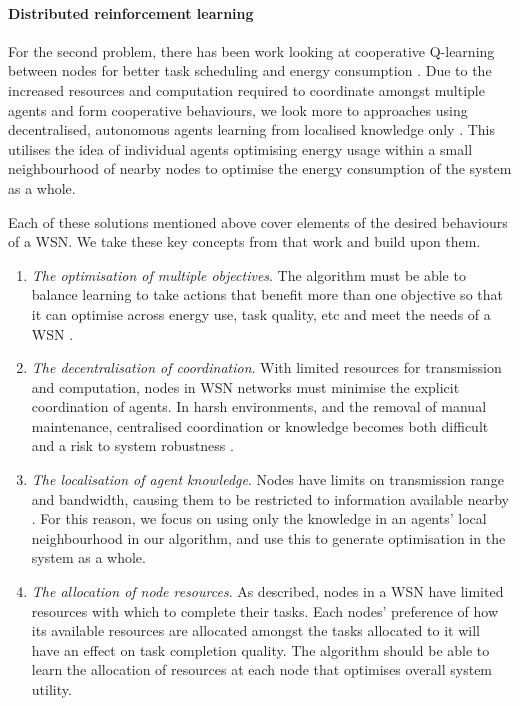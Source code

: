 \paragraph{Distributed reinforcement learning}
For the second problem, there has been work looking at cooperative Q-learning between nodes for better task scheduling and energy consumption \citep{doi:10.1155/2014/765182}. Due to the increased resources and computation required to coordinate amongst multiple agents and form cooperative behaviours, we look more to approaches using decentralised, autonomous agents learning from localised knowledge only \citep{10.1007/978-3-642-11814-2_4}.  This utilises the idea of individual agents optimising energy usage within a small neighbourhood of nearby nodes to optimise the energy consumption of the system as a whole. 

Each of these solutions mentioned above cover elements of the desired behaviours of a WSN. We take these key concepts from that work and build upon them.

\begin{enumerate}
	\item \textit{The optimisation of multiple objectives}.  The algorithm must be able to balance learning to take actions that benefit more than one objective so that it can optimise across energy use, task quality, etc and meet the needs of a WSN \citep{Guo2019, s150717572, SENGUPTA2013405}.

	\item \textit{The decentralisation of coordination}. With limited resources for transmission and computation, nodes in WSN networks must minimise the explicit coordination of agents.  In harsh environments, and the removal of manual maintenance, centralised coordination or knowledge becomes both difficult and a risk to system robustness \cite{XXX}.
	
	\item \textit{The localisation of agent knowledge}. Nodes have limits on transmission range and bandwidth, causing them to be restricted to information available nearby \citep{10.1007/978-3-642-11814-2_4}. For this reason, we focus on using only the knowledge in an agents' local neighbourhood in our algorithm, and use this to generate optimisation in the system as a whole.
	
	\item \textit{The allocation of node resources}. As described, nodes in a WSN have limited resources with which to complete their tasks. Each nodes' preference of how its available resources are allocated amongst the tasks allocated to it will have an effect on task completion quality. The algorithm should be able to learn the allocation of resources at each node that optimises overall system utility. 
\end{enumerate}


